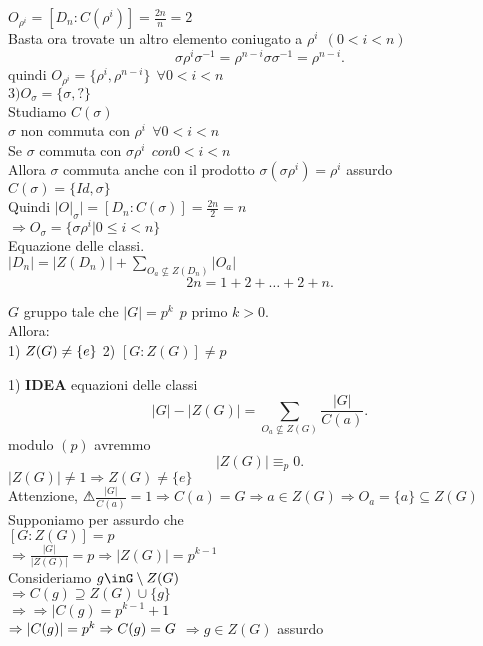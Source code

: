 \documentclass[12px]{article}
\begin{document}
\begin{dimo}
		 $O_{\rho^i} = [D_n:C(\rho^i)] = \frac{2n}n = 2$ \\
		 Basta ora trovate un altro elemento coniugato a $\rho^i \ \ (0<i<n)$
		  \[
			  \sigma\rho^i\sigma^{-1} = \rho^{n-i}\sigma\sigma^{-1} = \rho^{n-i}
		 .\] 
		 quindi $O_{\rho^i} = \{\rho^i, \rho^{n-i}\} \ \ \forall 0< i< n$\\
		 $3) O_\sigma = \{\sigma, ?\}$\\
		 Studiamo $C(\sigma)$\\
		  $\sigma$ non commuta con $\rho^i \ \ \forall 0 < i  <n$\\
		  Se $\sigma$ commuta con $\sigma\rho^i \ \ con 0<i<n$\\
		  Allora  $\sigma$ commuta anche con il prodotto $\sigma(\sigma\rho^i) = \rho^i$ assurdo \lightning \\
		  $C(\sigma) = \{Id, \sigma\}$\\
		  Quindi  $|O|_\sigma| = [D_n:C(\sigma)] = \frac{2n}2 = n$\\
		  $ \Rightarrow O_\sigma = \{\sigma\rho^i | 0\leq i < n\}$\\
		  Equazione delle classi.\\
		  $|D_n| = |Z(D_n)| + \sum_{O_a\not\subseteq Z(D_n)}|O_a|$\\
		   \[
		  2n = 1 + 2 + \ldots + 2 + n
		  .\] 



	\end{dimo}
	\begin{teo}
		$G$ gruppo tale che $|G| = p^k \ \ p$ primo $k>0$.\\
		Allora:\\
		1) $Z(G)\neq \{e\}\\$
		2) $[G:Z(G)] \neq p$
	\end{teo}
	\begin{dimo}
		1) \textbf{IDEA} equazioni delle classi
		\[
			|G| - |Z(G)| = \sum_{O_a\not\subseteq Z(G)}\frac{|G|}{C(a)}
		.\] 
		modulo  $(p)$ avremmo
		 \[
		|Z(G)|\equiv_p 0 
		.\] 
		$|Z(G)| \neq 1 \Rightarrow Z(G) \neq \{e\}$ \\
		Attenzione, $\warning \frac {|G|}{C(a)} = 1 \Rightarrow C(a) = G \Rightarrow a\in Z(G) \Rightarrow O_a = \{a\}\subseteq Z(G)$\\
		Supponiamo per assurdo che\\
		$[G:Z(G)] = p$ \\
		$ \Rightarrow \frac{|G|}{|Z(G)|} = p \Rightarrow |Z(G)| = p^{k-1}$ \\
		Consideriamo $g\inG\setminus Z(G)$\\
		$ \Rightarrow C(g)\supseteq Z(G)\cup \{g\}$ \\
		$ \Rightarrow  \Rightarrow |C(g) = p^{k-1} + 1$ \\
		$ \Rightarrow |C(g)| = p^k \Rightarrow C(g) = G\\$ 
		$ \Rightarrow g\in Z(G)$ assurdo
	\end{dimo}
\end{document}
